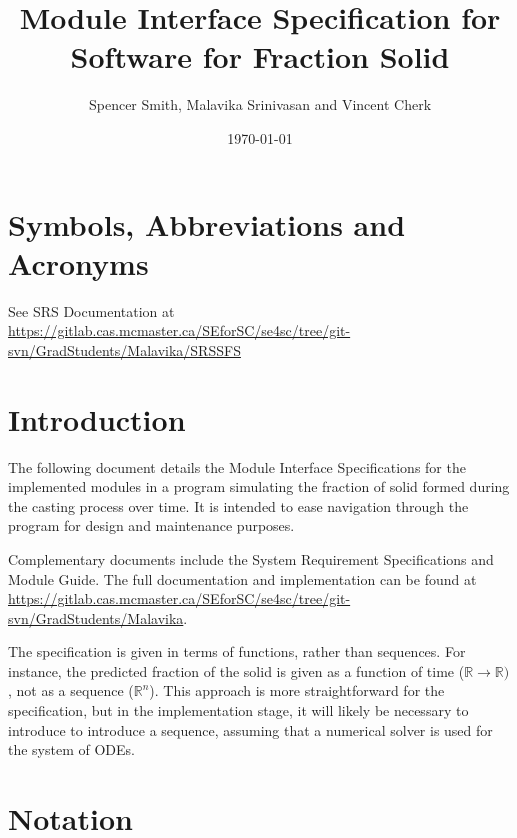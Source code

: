 \documentclass[12pt, titlepage]{article}
\begin{document}
\title{Module Interface Specification for Software for Fraction Solid}

\author{Spencer Smith, Malavika Srinivasan and Vincent Cherk}

\date{\today}

\maketitle


\section{Symbols, Abbreviations and Acronyms}

See SRS Documentation at
\url{https://gitlab.cas.mcmaster.ca/SEforSC/se4sc/tree/git-svn/GradStudents/Malavika/SRSSFS}

\newpage

\tableofcontents

\newpage


\section{Introduction}

The following document details the Module Interface Specifications for the
implemented modules in a program simulating the fraction of solid formed during
the casting process over time. It is intended to ease navigation through the
program for design and maintenance purposes.

Complementary documents include the System Requirement Specifications and Module
Guide.  The full documentation and implementation can be found at
\url{https://gitlab.cas.mcmaster.ca/SEforSC/se4sc/tree/git-svn/GradStudents/Malavika}.

The specification is given in terms of functions, rather than sequences.  For
instance, the predicted fraction of the solid is given as a function of time
($\mathbb{R} \rightarrow \mathbb{R})$, not as a sequence ($\mathbb{R}^n$).  This
approach is more straightforward for the specification, but in the
implementation stage, it will likely be necessary to introduce to introduce a
sequence, assuming that a numerical solver is used for the system of ODEs.

\section{Notation}
\end{document}
